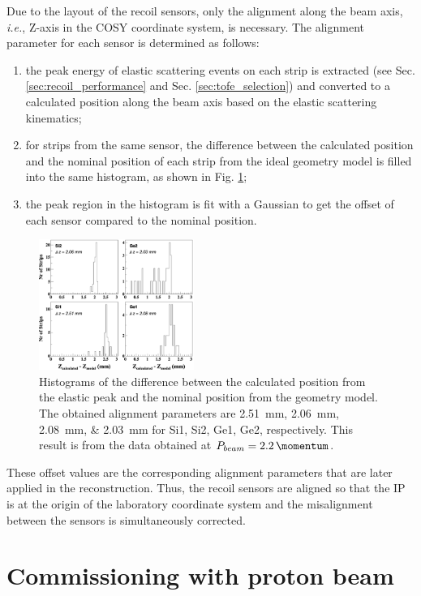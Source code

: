 \documentclass[number,5p]{elsarticle}
\begin{document}
Due to the layout of the recoil sensors, only the alignment along
the beam axis, \textit{i.e.}, Z-axis in the COSY coordinate system, is necessary.
The alignment parameter for each sensor is determined as follows:
\begin{enumerate}
\item the peak energy of elastic scattering events on each strip is extracted
  (see Sec. \ref{sec:recoil_performance} and Sec. \ref{sec:tofe_selection}) and converted to a calculated position along the beam axis based on the elastic
  scattering kinematics;
\item for strips from the same sensor, the difference between the calculated
  position and the nominal position of each strip from the ideal geometry model is filled into the same histogram, as shown in Fig. \ref{fig:alignment};
\item the peak region in the histogram is fit with a Gaussian to get the offset
  of each sensor compared to the nominal position.
\end{enumerate}
\begin{figure}[th!]
  \centering
  \includegraphics[width=0.45\textwidth]{./alignment.png}
  \caption{Histograms of the difference between the calculated position from the
    elastic peak and the nominal position from the geometry model.
    The obtained alignment parameters are
    \SIlist[list-units=single]{2.51;2.06;2.08;2.03}{\mm} for Si1, Si2, Ge1, Ge2, respectively.
    This result is from the data obtained at $P_{beam} =
    \SI{2.2}{\momentum}$.}
  \label{fig:alignment}
\end{figure}
These offset values are the corresponding alignment parameters that are later applied in the reconstruction.
Thus, the recoil sensors are aligned so that the IP is at the origin of the
laboratory coordinate system and the misalignment between the sensors is
simultaneously corrected.

\section{Commissioning with proton beam}
\label{sec:result}
\end{document}

